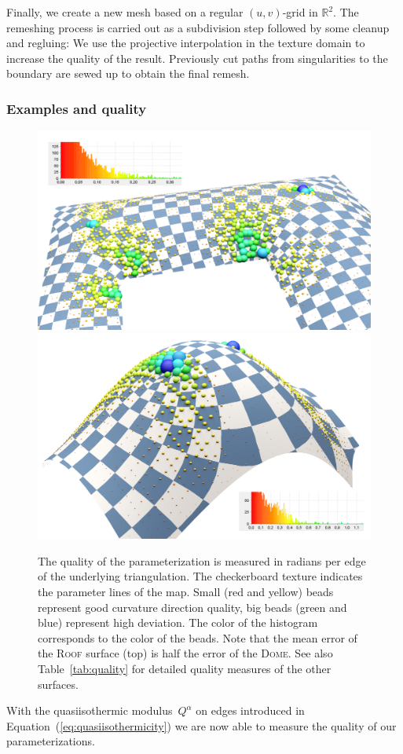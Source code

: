 \documentclass[Thesis.tex]{subfiles}
\begin{document}
Finally, we create a new mesh based on a regular $(u,v)$-grid in $\mathbb R^2$. 
The remeshing process is carried out as a subdivision step followed by some cleanup
and regluing: We use the projective interpolation in the texture domain to 
increase the quality of the result. Previously cut paths from singularities to the 
boundary are sewed up to obtain the final remesh.

\subsubsection{Examples and quality}
\label{subsub:examples_quality}

\begin{figure}
\includegraphics[width=\linewidth]{image/aag2012/dach01_quality_highres.png}
\includegraphics[width=\linewidth]{image/aag2012/dach02_quality_highres.png}
\caption[Parameterization quality plot]{The quality of the parameterization is measured in radians per
edge of the underlying triangulation. The checkerboard texture indicates the parameter
lines of the map. Small (red and yellow) beads represent good curvature direction quality, big
beads (green and blue) represent high deviation. The color of the histogram
corresponds to the color of the beads. Note that the mean error of the \textsc{Roof} 
surface (top) is half the error of the \textsc{Dome}. See also Table~\ref{tab:quality} 
for detailed quality measures of the other surfaces.}
\label{fig:quality}
\end{figure}
With the quasiisothermic modulus~$Q^\alpha$ on edges introduced in
Equation~(\ref{eq:quasiisothermicity}) we are now able to measure the 
quality of our parameterizations. 
\end{document}
